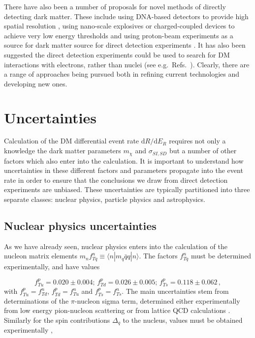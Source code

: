 There have also been a number of proposals for novel methods of directly detecting dark matter. These include using DNA-based detectors to provide high spatial resolution \cite{Drukier:2012}, using nano-scale explosives \cite{Lopez:2014} or charged-coupled devices \cite{Aguilar-Arevalo:2013} to achieve very low energy thresholds and using proton-beam experiments as a source for dark matter source for direct detection experiments \cite{deNiverville:2012}. It has also been suggested the direct detection experiments could be used to search for DM interactions with electrons, rather than nuclei (see e.g.~Refs.~\cite{Essig:2012a,Essig:2012b}). Clearly, there are a range of approaches being pursued both in refining current technologies and developing new ones.



\section{Uncertainties}

Calculation of the DM differential event rate $\mathrm{d}R/\mathrm{d}E_R$ requires not only a knowledge the dark matter parameters $m_\chi$ and $\sigma_{SI,SD}$ but a number of other factors which also enter into the calculation. It is important to understand how uncertainties in these different factors and parameters propagate into the event rate in order to ensure that the conclusions we draw from direct detection experiments are unbiased. These uncertainties are typically partitioned into three separate classes: nuclear physics, particle physics and astrophysics.

\subsection{Nuclear physics uncertainties}
\label{sec:DD:nuclearunc}

As we have already seen, nuclear physics enters into the calculation of the nucleon matrix elements $m_n f_{Tq}^n \equiv \langle n|m_q\bar{q}q|n \rangle$. The factors $f_{Tq}^n$ must be determined experimentally, and have values

\begin{equation}
f_{Tu}^p = 0.020 \pm 0.004 ;\, f_{Td}^p = 0.026 \pm 0.005 ;\, f_{Ts}^p = 0.118 \pm 0.062\,,
\end{equation}
with $f_{Tu}^p = f_{Td}^n$, $f_{Td}^p = f_{Tu}^n$ and $f_{Ts}^p = f_{Ts}^n$. %
The main uncertainties stem from determinations of the $\pi$-nucleon sigma term, determined either experimentally from low energy pion-nucleon scattering \cite{Borasoy:1995, Pavan:2001,Alarcon:2012} or from lattice QCD calculations \cite{Bali:2012, Alvarez-Ruso:2014}. Similarly for the spin contributions $\Delta_q$ to the nucleus, values must be obtained experimentally \cite{Ashman:1988,Jaffe:1990,Engel:1992,Adams:1997},

